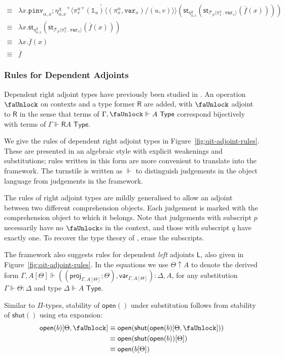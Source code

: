 \documentclass[10pt]{article}
\theoremstyle{definition}
\newcommand{\TYPE}{\,\,\mathsf{Type}}
\newcommand{\rewrite}[2]{\overleftarrow{#1}(#2)}
\newcommand\UI[2]{\ensuremath{\lambda #1.#2}}
\newcommand\StI[2]{\ensuremath{\mathsf{st}_{#1}(#2)}}
\newcommand\TrPlus[2]{\ensuremath{{#1}^+(#2)}}
\newcommand\ApEl[2]{\mathcal{T}_{#1}\langle#2\rangle}
\newcommand\bdot[0]{\mathbin{.}}
\newcommand\ap[2]{\ensuremath{#1 \langle #2 \rangle }}
\newcommand\ApPlus[2]{\ensuremath{{#1}^+ \langle #2 \rangle }}
\newcommand{\qyields}{\Vdash}
\newcommand{\upstairs}[1]{\overline{#1}}
\newcommand\proj[1]{\ensuremath{\mathsf{proj}_{#1}}}
\newcommand\qvar[1]{\ensuremath{\mathsf{var}_{#1}}}
\newcommand\One{\ensuremath{\mathds{1}}}
\newcommand\var[1]{\ensuremath{\mathtt{var}_{#1}}}
\newcommand\pinv[1]{\ensuremath{\mathtt{pinv}_{#1}}}
\newcommand{\lock}{\text{\faUnlock}}
\newcommand{\Rtype}[1]{\mathsf{R}{#1}}
\newcommand{\RI}[1]{\mathsf{shut}({#1})}
\newcommand{\RE}[1]{\mathsf{open}({#1})}
\newcommand{\Ltype}[1]{\mathsf{L}{#1}}
\begin{document}
\begin{enumerate}[style = multiline, labelwidth = 80pt]
\begin{align*}
\equiv{} &\UI{x}{\rewrite{\pinv{\alpha,x};\ApPlus{\eta^\chi_{\alpha.x}}{\ap{\TrPlus{\pi^u_v}{\One_u}}{(\pi^\alpha_x,\var{x})/(u,v)}}}{\StI{\eta^\chi_{\alpha.x}}{\StI{\ApEl{p}{\pi^\alpha_x \bdot \var{x}}}{\upstairs{f}(x)}}}} \\
\equiv{} &\UI{x}{\StI{\eta^\chi_{\alpha.x}}{\StI{\ApEl{p}{\pi^\alpha_x \bdot \var{x}}}{\upstairs{f}(x)}}} \\
\equiv{} &\UI{x}{\upstairs{f}(x)} \\
\equiv{} &\upstairs{f}
\end{align*}
\end{enumerate}

\subsubsection{Rules for Dependent Adjoints}

Dependent right adjoint types have previously been studied in . An operation $\lock$ on contexts and a type former $\Rtype{}$ are added, with $\lock$ adjoint to $\Rtype{}$ in the sense that terms of $\Gamma, \lock \qyields A \TYPE$ correspond bijectively with terms of $\Gamma \qyields \Rtype{A} \TYPE$.

We give the rules of dependent right adjoint types in Figure~\ref{fig:qit-adjoint-rules}. These are presented in an algebraic style with explicit weakenings and substitutions; rules written in this form are more convenient to translate into the framework. The turnstile is written as $\qyields$ to distinguish judgements in the object language from judgements in the framework.

The rules of right adjoint types are mildly generalised to allow an adjoint between two different comprehension objects. Each judgement is marked with the comprehension object to which it belongs. Note that judgements with subscript $p$ necessarily have no $\lock$s in the context, and those with subscript $q$ have exactly one. To recover the type theory of , erase the subscripts. 

The framework also suggests rules for dependent \emph{left} adjoints $\Ltype{}$, also given in Figure~\ref{fig:qit-adjoint-rules}. In the equations we use $\Theta \uparrow A$ to denote the derived form $\Gamma, A[\Theta] \qyields ((\proj{\Gamma, A[\Theta]}; \Theta) , \qvar{\Gamma, A[\Theta]}) : \Delta, A$, for any substitution $\Gamma \qyields \Theta : \Delta$ and type $\Delta \qyields A \TYPE$.

Similar to $\Pi$-types, stability of $\RE{}$ under substitution follows from stability of $\RI{}$ using eta expansion:
\begin{align*}
\RE{b}[\Theta, \lock] 
&\equiv \RE{\RI{\RE{b}[\Theta, \lock]}} \\
&\equiv \RE{\RI{\RE{b}}[\Theta]} \\
&\equiv \RE{b[\Theta]}
\end{align*}
\end{document}
